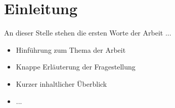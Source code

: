 
\newpage
\chapter{Einleitung}

An dieser Stelle stehen die ersten Worte der Arbeit ...

\begin{itemize}
    \item Hinführung zum Thema der Arbeit
    \item Knappe Erläuterung der Fragestellung
    \item Kurzer inhaltlicher Überblick
    \item ...
\end{itemize}